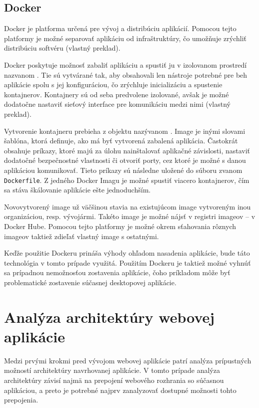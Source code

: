 \subsection {Docker}
Docker je platforma určená pre vývoj a distribúciu aplikácií. Pomocou tejto platformy je možné separovať aplikáciu od infraštruktúry, čo umožňuje zrýchliť distribúciu softvéru \cite{about_docker} (vlastný preklad).

Docker poskytuje možnosť zabaliť aplikáciu a spustiť ju v izolovanom prostredí nazvanom . Tie sú vytvárané tak, aby obsahovali len nástroje potrebné pre beh aplikácie spolu s jej konfiguráciou, čo zrýchluje inicializáciu a spustenie kontajnerov. Kontajnery sú od seba predvolene izolované, avšak je možné dodatočne nastaviť sieťový interface pre komunikáciu medzi nimi \cite{about_docker} (vlastný preklad).

Vytvorenie kontajneru prebieha z objektu nazývanom . Image je inými slovami šablóna, ktorá definuje, ako má byť vytvorená zabalená aplikácia. Častokrát obsahuje príkazy, ktoré majú za úlohu nainštalovať aplikačné závislosti, nastaviť dodatočné bezpečnostné vlastnosti či otvoriť porty, cez ktoré je možné s danou aplikáciou komunikovať. Tieto príkazy sú následne uložené do súboru zvanom \texttt{Dockerfile}. Z jedného Docker Imagu je možné spustiť viacero kontajnerov, čím sa stáva škálovanie aplikácie ešte jednoduchším.

Novovytvorený image už väčšinou stavia na existujúcom image vytvoreným inou organizáciou, resp. vývojármi. Takéto image je možné nájsť v registri imageov -- v Docker Hube. Pomocou tejto platformy je možné okrem sťahovania rôznych imageov taktiež zdieľať vlastný image s ostatnými.

Keďže použitie Dockeru prináša výhody ohľadom nasadenia aplikácie, bude táto technológia v tomto prípade využitá. Použitím Dockeru je taktiež možné vyhnúť sa prípadnou nemožnosťou zostavenia aplikácie, čoho príkladom môže byť problematické zostavenie súčasnej desktopovej aplikácie.

\clearpage

\section {Analýza architektúry webovej aplikácie}
Medzi prvými krokmi pred vývojom webovej aplikácie patrí analýza prípustných možností architektúry navrhovanej aplikácie. V tomto prípade analýza architektúry závisí najmä na prepojení webového rozhrania so súčasnou aplikáciou, a preto je potrebné najprv zanalyzovať dostupné možnosti tohto prepojenia.

